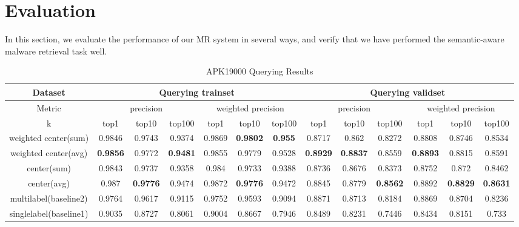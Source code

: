 \section{Evaluation}
In this section, we evaluate the performance of our MR system in several ways, and verify that we have performed the semantic-aware malware retrieval task well.

\begin{table*}[!htb]%
\caption{APK19000 Querying Results}
\label{tab:apk_result}
\begin{minipage}{\textwidth}
\begin{center}
\begin{tabular}{|c|c|c|c|c|c|c|c|c|c|c|c|c|}
\hline
Dataset             & \multicolumn{6}{c|}{Querying trainset}                      & \multicolumn{6}{c|}{Querying validset}                      \\ \hline
Metric              & \multicolumn{3}{c|}{precision}  & \multicolumn{3}{c|}{weighted precision} & \multicolumn{3}{c|}{precision}  & \multicolumn{3}{c|}{weighted precision} \\ \hline
k              & top1   & top10  & top100 & top1      & top10     & top100   & top1   & top10  & top100 & top1      & top10     & top100   \\ \hline
weighted center(sum)  & 0.9846 & 0.9743 & 0.9374 & 0.9869    & \textbf{0.9802}   & \textbf{0.955}    & 0.8717 & 0.862  & 0.8272 & 0.8808    & 0.8746    & 0.8534   \\ \hline
weighted center(avg) & \textbf{0.9856} & 0.9772 & \textbf{0.9481} & 0.9855    & 0.9779    & 0.9528   & \textbf{0.8929 }& \textbf{0.8837 }& 0.8559 & \textbf{0.8893   } & 0.8815    & 0.8591   \\ \hline
center(sum)         & 0.9843 & 0.9737 & 0.9358 & 0.984     & 0.9733    & 0.9388   & 0.8736 & 0.8676 & 0.8373 & 0.8752    & 0.872     & 0.8462   \\ \hline
center(avg)        & 0.987  & \textbf{0.9776} & 0.9474 & 0.9872    & \textbf{0.9776}    & 0.9472   & 0.8845 & 0.8779 & \textbf{0.8562} & 0.8892    & \textbf{0.8829}    & \textbf{0.8631}   \\ \hline
multilabel(baseline2)               & 0.9764 & 0.9617 & 0.9115 & 0.9752    & 0.9593    & 0.9094   & 0.8871 & 0.8713 & 0.8184 & 0.8869    & 0.8704    & 0.8236   \\ \hline
singlelabel(baseline1)              & 0.9035 & 0.8727 & 0.8061 & 0.9004    & 0.8667    & 0.7946   & 0.8489 & 0.8231 & 0.7446 & 0.8434    & 0.8151    & 0.733    \\ \hline
\end{tabular}
\end{center}
\bigskip\centering
\end{minipage}
\end{table*}%


